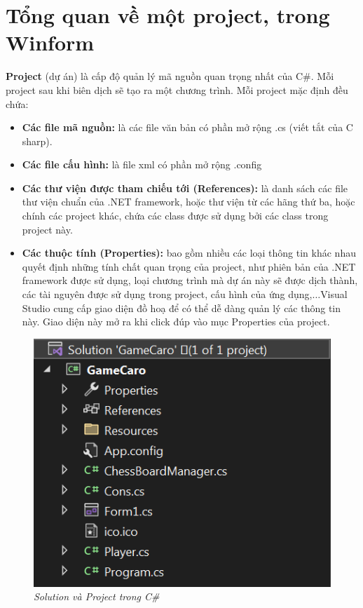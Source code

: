 \section{Tổng quan về một project, trong Winform}

\textbf{Project} (dự án) là cấp độ quản lý mã nguồn quan trọng nhất của C\#. Mỗi project sau khi biên dịch sẽ tạo ra một chương trình. Mỗi project mặc định đều chứa:
\newpage
\begin{itemize}
	\item \textbf{Các file mã nguồn:} là các file văn bản có phần mở rộng .cs (viết tắt của C sharp).
	\item \textbf{Các file cấu hình:} là file xml có phần mở rộng .config
	\item \textbf{Các thư viện được tham chiếu tới (References):} là danh sách các file thư viện chuẩn của .NET framework, hoặc thư viện từ các hãng thứ ba, hoặc chính các project khác, chứa các class được sử dụng bởi các class trong project này.
	\item \textbf{Các thuộc tính (Properties):} bao gồm nhiều các loại thông tin khác nhau quyết định những tính chất quan trọng của project, như phiên bản của .NET framework được sử dụng, loại chương trình mà dự án này sẽ được dịch thành, các tài nguyên được sử dụng trong project, cấu hình của ứng dụng,$\dots$Visual Studio cung cấp giao diện đồ hoạ để có thể dễ dàng quản lý các thông tin này. Giao diện này mở ra khi click đúp vào mục Properties của project.
\end{itemize}

\begin{figure}[h!]
	\centering
	\includegraphics[scale=.99]{image/solution.png}
	\caption{\textit{Solution và Project trong C\#}} 
\end{figure}

